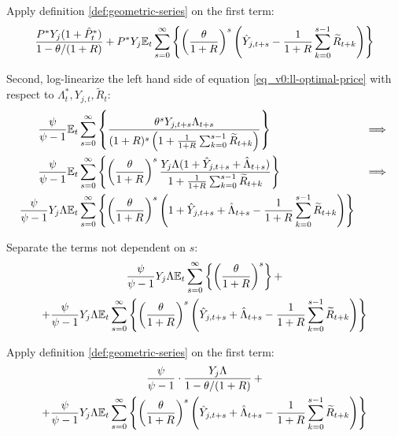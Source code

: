 \documentclass[
thesis.tex
]{subfiles}
\begin{document}
	Apply definition \ref{def:geometric-series} on the first term:
	\begin{align}
		\frac{ P^\ast Y_{j} ( 1 + \hat{P}_t^\ast ) }{1-\theta /(1+R)} + P^\ast Y_{j} {\mathbb{E}_{t}} \sum_{s=0}^{\infty} \left\{ \left( \frac{\theta}{1 + R} \right)^s \left( \hat{Y}_{j,t+s} - \frac{1}{1 + R} \sum_{k=0}^{s-1} \widetilde{R}_{t+k} \right) \right\} \nonumber
	\end{align}
	
	Second, log-linearize the left hand side of equation \ref{eq_v0:ll-optimal-price} with respect to \( \Lambda_t^\ast, Y_{j,t}, \widetilde{R}_t \):
	\begin{alignat}{2}
		\frac{\psi}{\psi-1} &{\mathbb{E}_{t}} \sum_{s=0}^{\infty} \left\{ \frac{\theta^s Y_{j,t+s} \Lambda_{t+s}}{ (1 + R)^s \left( 1 + \frac{1}{1 + R} \sum_{k=0}^{s-1} \widetilde{R}_{t+k} \right) } \right\} & \implies \nonumber \\
		\frac{\psi}{\psi-1} &{\mathbb{E}_{t}} \sum_{s=0}^{\infty} \left\{ \left( \frac{\theta}{1 + R} \right)^s \frac{ Y_{j} \Lambda (1+ \hat{Y}_{j,t+s} + \hat{\Lambda}_{t+s}) }{ 1 + \frac{1}{1 + R} \sum_{k=0}^{s-1} \widetilde{R}_{t+k} } \right\} & \implies \nonumber \\
		\frac{\psi}{\psi-1} Y_{j} \Lambda &{\mathbb{E}_{t}} \sum_{s=0}^{\infty} \left\{ \left( \frac{\theta}{1 + R} \right)^s \left( 1+ \hat{Y}_{j,t+s} + \hat{\Lambda}_{t+s} - \frac{1}{1 + R} \sum_{k=0}^{s-1} \widetilde{R}_{t+k} \right) \right\} & \nonumber
	\end{alignat}
	
	Separate the terms not dependent on $s$:
	\begin{multline}
		\frac{\psi}{\psi-1} Y_{j} \Lambda {\mathbb{E}_{t}} \sum_{s=0}^{\infty} \left\{ \left( \frac{\theta}{1 + R} \right)^s \right\} + 
		\\
		+ \frac{\psi}{\psi-1} Y_{j} \Lambda {\mathbb{E}_{t}} \sum_{s=0}^{\infty} \left\{ \left( \frac{\theta}{1 + R} \right)^s \left( \hat{Y}_{j,t+s} + \hat{\Lambda}_{t+s} - \frac{1}{1 + R} \sum_{k=0}^{s-1} \widetilde{R}_{t+k} \right) \right\} \nonumber
	\end{multline}
	
	Apply definition \ref{def:geometric-series} on the first term:
	\begin{multline}
		\frac{\psi}{\psi-1} \cdot \frac{Y_{j} \Lambda}{1-\theta /(1+R)} \, + 
		\\
		+ \frac{\psi}{\psi-1} Y_{j} \Lambda {\mathbb{E}_{t}} \sum_{s=0}^{\infty} \left\{ \left( \frac{\theta}{1 + R} \right)^s \left( \hat{Y}_{j,t+s} + \hat{\Lambda}_{t+s} - \frac{1}{1 + R} \sum_{k=0}^{s-1} \widetilde{R}_{t+k} \right) \right\} \nonumber
	\end{multline}
	
\end{document}
